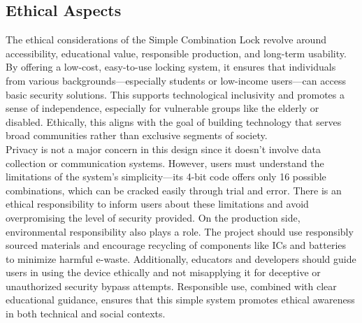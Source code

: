 \subsection{Ethical Aspects}
The ethical considerations of the Simple Combination Lock revolve around accessibility, educational value, responsible production, and long-term usability. By offering a low-cost, easy-to-use locking system, it ensures that individuals from various backgrounds—especially students or low-income users—can access basic security solutions. This supports technological inclusivity and promotes a sense of independence, especially for vulnerable groups like the elderly or disabled. Ethically, this aligns with the goal of building technology that serves broad communities rather than exclusive segments of society.\\
Privacy is not a major concern in this design since it doesn’t involve data collection or communication systems. However, users must understand the limitations of the system’s simplicity—its 4-bit code offers only 16 possible combinations, which can be cracked easily through trial and error. There is an ethical responsibility to inform users about these limitations and avoid overpromising the level of security provided. On the production side, environmental responsibility also plays a role. The project should use responsibly sourced materials and encourage recycling of components like ICs and batteries to minimize harmful e-waste. Additionally, educators and developers should guide users in using the device ethically and not misapplying it for deceptive or unauthorized security bypass attempts. Responsible use, combined with clear educational guidance, ensures that this simple system promotes ethical awareness in both technical and social contexts.\cite{4.1.3}
